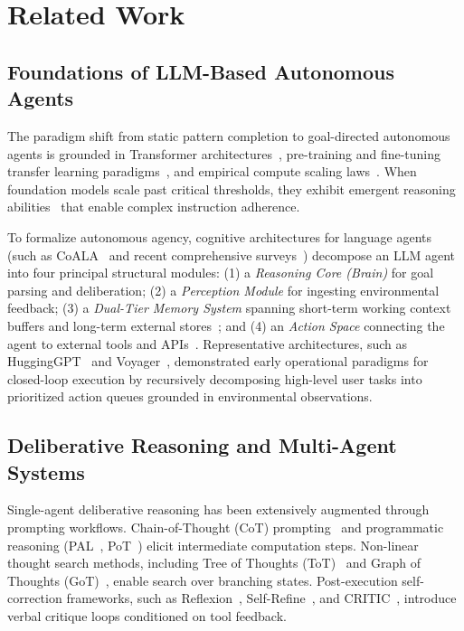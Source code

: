 \section{Related Work}
\label{sec:related_work}

\subsection{Foundations of LLM-Based Autonomous Agents}
The paradigm shift from static pattern completion to goal-directed autonomous agents is grounded in Transformer architectures~\cite{Vaswani2017Attention}, pre-training and fine-tuning transfer learning paradigms~\cite{Devlin2019BERT,Raffel2020Exploring,Brown2020Language,Chowdhery2023PaLM}, and empirical compute scaling laws~\cite{Kaplan2020Scaling,Hoffmann2022Training}. When foundation models scale past critical thresholds, they exhibit emergent reasoning abilities~\cite{Wei2022Emergent} that enable complex instruction adherence. 

To formalize autonomous agency, cognitive architectures for language agents (such as CoALA~\cite{Sumers2024Cognitive} and recent comprehensive surveys~\cite{Wang2024Survey,Xi2025Rise}) decompose an LLM agent into four principal structural modules:
(1) a \textit{Reasoning Core (Brain)} for goal parsing and deliberation;
(2) a \textit{Perception Module} for ingesting environmental feedback;
(3) a \textit{Dual-Tier Memory System} spanning short-term working context buffers and long-term external stores~\cite{Park2023Generative}; and
(4) an \textit{Action Space} connecting the agent to external tools and APIs~\cite{Yao2023ReAct,Schick2023Toolformer,Patil2024Gorilla}.
Representative architectures, such as HuggingGPT~\cite{Shen2023HuggingGPT} and Voyager~\cite{Wang2024Voyager}, demonstrated early operational paradigms for closed-loop execution by recursively decomposing high-level user tasks into prioritized action queues grounded in environmental observations.

\subsection{Deliberative Reasoning and Multi-Agent Systems}
Single-agent deliberative reasoning has been extensively augmented through prompting workflows. Chain-of-Thought (CoT) prompting~\cite{Wei2022Chain,Kojima2022Large} and programmatic reasoning (PAL~\cite{Gao2023PAL}, PoT~\cite{Chen2023Program}) elicit intermediate computation steps. Non-linear thought search methods, including Tree of Thoughts (ToT)~\cite{Yao2023Tree} and Graph of Thoughts (GoT)~\cite{Besta2024Graph}, enable search over branching states. Post-execution self-correction frameworks, such as Reflexion~\cite{Shinn2023Reflexion}, Self-Refine~\cite{Madaan2023SelfRefine}, and CRITIC~\cite{Gou2024CRITIC}, introduce verbal critique loops conditioned on tool feedback.

